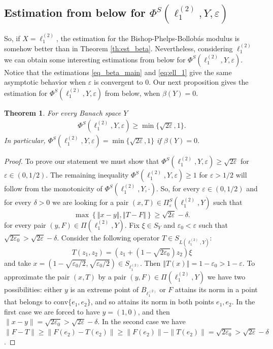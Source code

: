 \documentclass[11pt,a4paper]{amsart}
\newcommand{\eps}{\varepsilon}
\newcommand{\conv}{{\mathrm{conv}}}
\newcommand{\norm}[1]{\left\Vert#1\right\Vert}
\numberwithin{equation}{section}
\theoremstyle{plain}
\newtheorem{theorem}{Theorem}[section]
\theoremstyle{definition}
\renewcommand{\geq}{\geqslant}
\begin{document}
\subsection{Estimation from below for $\Phi^S(\ell^{(2)}_1,Y,\eps)$} \label{ssectestbelow} 
So, if $X=\ell_1^{(2)}$, the estimation for  the Bishop-Phelps-Bollob\'{a}s modulus is somehow better than in Theorem \ref{th:est_beta}. Nevertheless, considering $\ell_1^{(2)}$ we can obtain some interesting estimations from below for $\Phi^S(\ell^{(2)}_1,Y,\eps)$. Notice that the estimations \eqref{eq_beta_main} and \eqref{eq:ell_1} give the same asymptotic behavior  when $\eps$ is convergent to $0$. Our next proposition gives the estimation for $\Phi^S(\ell^{(2)}_1,Y,\eps)$ from below, when $\beta(Y)=0$.


\begin{theorem}\label{th:est_beta2}
For every Banach space $Y$ 
\begin{align*}
\Phi^S(\ell^{(2)}_1,Y,\varepsilon)\geq\min\{\sqrt{2\varepsilon}, 1\}.
\end{align*}  
In particular, $\Phi^S(\ell^{(2)}_1,Y,\varepsilon) = \min\{\sqrt{2\varepsilon}, 1\}$ if  $\beta(Y)=0$.
\end{theorem}
\begin{proof}

To prove our statement we must show that $\Phi^S(\ell^{(2)}_1,Y,\varepsilon)\geq \sqrt{2\varepsilon}$ for $\eps\in (0,1/2)$. The remaining inequality $\Phi^S(\ell^{(2)}_1,Y,\varepsilon)\geq 1$ for  $\eps > 1/2$ will follow from the monotonicity of $\Phi^S(\ell^{(2)}_1,Y,\cdot)$. So, for every $\eps\in (0,1/2)$ 
and for every $\delta > 0$ we are looking for a pair $(x, T) \in \Pi^S_\eps(\ell^{(2)}_1, Y)$ such that 
\begin{equation*}
\max\left\{ \norm{x-y}, \norm{T-F}\right\}\geq \sqrt{2\varepsilon} - \delta.
\end{equation*}
for every pair $(y, F) \in \Pi(\ell^{(2)}_1, Y)$.  Fix $\xi\in S_Y$  and $\eps_0 < \eps$ such that $\sqrt{2\eps_0} > \sqrt{2\varepsilon} - \delta$. Consider the following operator $T  \in S_{L(\ell_1^{(2)},Y)}$:
$$
T(z_1, z_2)=(z_1+(1-\sqrt{2\eps_0})z_2)\xi
$$ 
and take $x=(1-\sqrt{\eps_0/2},\sqrt{\eps_0/2})\in S_{\ell_1^{(2)}}$. Then $ \norm{T(x)} = 1-\eps_0 > 1 - \eps$.  
To approximate the pair $(x,T)$  by a pair $(y, F)\in \Pi(\ell^{(2)}_1, Y)$ we have two possibilities: either $y$ is an extreme point of $B_{\ell^{(2)}_1}$ or $F$ attains its norm in a point that belongs to $\conv\{e_1, e_2\}$, and so attains its norm in both points $e_1, e_2$. In the first case we are forced to have $y=(1,0)$, and then $\|x-y\|=\sqrt{2\eps_0}> \sqrt{2\varepsilon} - \delta$. In the second case we have
$\|F-T\|\geq\|F(e_2)-T(e_2)\|\geq \|F(e_2)\|-\|T(e_2)\|=\sqrt{2\eps_0} > \sqrt{2\varepsilon} - \delta$.
\end{proof}
\end{document}
